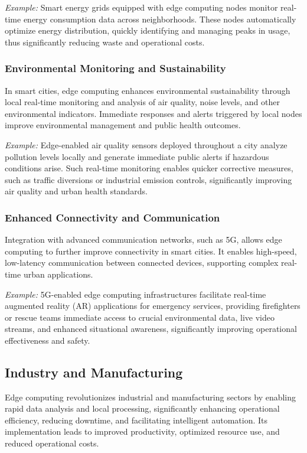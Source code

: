 \documentclass[runningheads]{llncs}
\begin{document}
\textit{Example:} Smart energy grids equipped with edge computing nodes monitor real-time energy consumption data across neighborhoods. These nodes automatically optimize energy distribution, quickly identifying and managing peaks in usage, thus significantly reducing waste and operational costs.

\subsubsection{Environmental Monitoring and Sustainability}
In smart cities, edge computing enhances environmental sustainability through local real-time monitoring and analysis of air quality, noise levels, and other environmental indicators. Immediate responses and alerts triggered by local nodes improve environmental management and public health outcomes.

\textit{Example:} Edge-enabled air quality sensors deployed throughout a city analyze pollution levels locally and generate immediate public alerts if hazardous conditions arise. Such real-time monitoring enables quicker corrective measures, such as traffic diversions or industrial emission controls, significantly improving air quality and urban health standards.

\subsubsection{Enhanced Connectivity and Communication}
Integration with advanced communication networks, such as 5G, allows edge computing to further improve connectivity in smart cities. It enables high-speed, low-latency communication between connected devices, supporting complex real-time urban applications.

\textit{Example:} 5G-enabled edge computing infrastructures facilitate real-time augmented reality (AR) applications for emergency services, providing firefighters or rescue teams immediate access to crucial environmental data, live video streams, and enhanced situational awareness, significantly improving operational effectiveness and safety.


\subsection{Industry and Manufacturing}

Edge computing revolutionizes industrial and manufacturing sectors by enabling rapid data analysis and local processing, significantly enhancing operational efficiency, reducing downtime, and facilitating intelligent automation. Its implementation leads to improved productivity, optimized resource use, and reduced operational costs.
\end{document}
